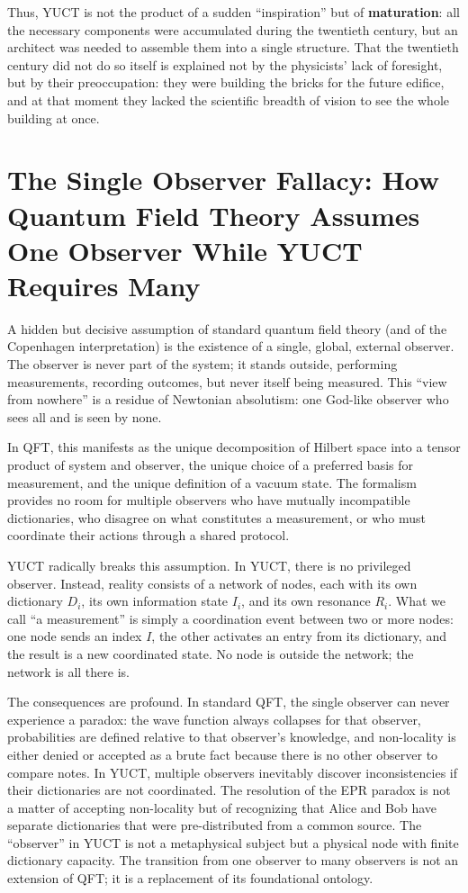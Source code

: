 \documentclass[12pt,a4paper]{article}
\begin{document}
	Thus, YUCT is not the product of a sudden ``inspiration'' but of \textbf{maturation}: all the necessary components were accumulated during the twentieth century, but an architect was needed to assemble them into a single structure. That the twentieth century did not do so itself is explained not by the physicists' lack of foresight, but by their preoccupation: they were building the bricks for the future edifice, and at that moment they lacked the scientific breadth of vision to see the whole building at once.
	
	\section{The Single Observer Fallacy: How Quantum Field Theory Assumes One Observer While YUCT Requires Many}
	
	A hidden but decisive assumption of standard quantum field theory (and of the Copenhagen interpretation) is the existence of a single, global, external observer. The observer is never part of the system; it stands outside, performing measurements, recording outcomes, but never itself being measured. This ``view from nowhere'' is a residue of Newtonian absolutism: one God-like observer who sees all and is seen by none.
	
	In QFT, this manifests as the unique decomposition of Hilbert space into a tensor product of system and observer, the unique choice of a preferred basis for measurement, and the unique definition of a vacuum state. The formalism provides no room for multiple observers who have mutually incompatible dictionaries, who disagree on what constitutes a measurement, or who must coordinate their actions through a shared protocol.
	
	YUCT radically breaks this assumption. In YUCT, there is no privileged observer. Instead, reality consists of a network of nodes, each with its own dictionary \(D_i\), its own information state \(I_i\), and its own resonance \(R_i\). What we call ``a measurement'' is simply a coordination event between two or more nodes: one node sends an index \(I\), the other activates an entry from its dictionary, and the result is a new coordinated state. No node is outside the network; the network is all there is.
	
	The consequences are profound. In standard QFT, the single observer can never experience a paradox: the wave function always collapses for that observer, probabilities are defined relative to that observer's knowledge, and non-locality is either denied or accepted as a brute fact because there is no other observer to compare notes. In YUCT, multiple observers inevitably discover inconsistencies if their dictionaries are not coordinated. The resolution of the EPR paradox is not a matter of accepting non-locality but of recognizing that Alice and Bob have separate dictionaries that were pre-distributed from a common source. The ``observer'' in YUCT is not a metaphysical subject but a physical node with finite dictionary capacity. The transition from one observer to many observers is not an extension of QFT; it is a replacement of its foundational ontology.
	
\end{document}
